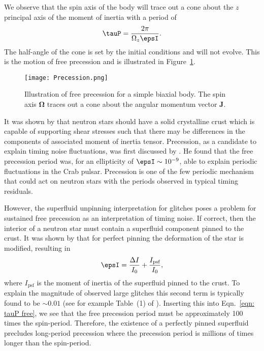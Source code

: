 We observe that the spin axis of the body will trace out a cone about the $z$
principal axis of the moment of inertia with a period of
\begin{align}
\tauP = \frac{2\pi}{\Omega_{z}\epsI}.
\label{eqn: tauP free}
\end{align}
The half-angle of the cone is set by the
initial conditions and will not evolve. This is the motion of free precession
and is illustrated in Figure~\ref{fig: precession}.
\begin{figure}[htb]
\centering
\texttt{[image: Precession.png]}
\caption{Illustration of free precession for a simple biaxial body. The spin
    axis $\mathbf{\Omega}$ traces out a cone about the angular momentum vector $\mathbf{J}$.}
\label{fig: precession}
\end{figure}

It was shown by \citet{ruderman1969neutron} that neutron stars should have a
solid crystalline crust which is capable of supporting shear stresses such
that there may be differences in the components of associated moment of inertia
tensor. Precession, as a candidate to explain timing noise
fluctuations, was first discussed by \citet{Ruderman1970}. He found that the
free precession period was, for an ellipticity of $\epsI \sim 10^{-9}$, able to
explain periodic fluctuations in the Crab pulsar.
Precession is one of the few periodic mechanism that could act on neutron stars
with the periods observed in typical timing residuals.

However, the superfluid unpinning interpretation for glitches poses a problem for
sustained free precession as an interpretation of timing noise. If correct,
then the interior of a neutron star must contain a superfluid component pinned
to the crust. It was shown by \citet{Shaham1977} that for perfect pinning the
deformation of the star is modified, resulting in
\begin{align}
\epsI = \frac{\Delta I}{I_0} + \frac{I_{\textrm{psf}}}{I_0},
\end{align}
where $I_\textrm{psf}$ is the moment of inertia of the superfluid pinned to the
crust. To explain the magnitude of observed large glitches this second term is
typically found to be $\sim 0.01$ (see for example Table~(1) of
\citet{andersson2012}). Inserting this into Eqn.~\eqref{eqn: tauP free}, we see
that the free precession period must be approximately 100 times the
spin-period. Therefore, the existence of a perfectly pinned superfluid
precludes long-period precession where the precession period is millions of
times longer than the spin-period.

